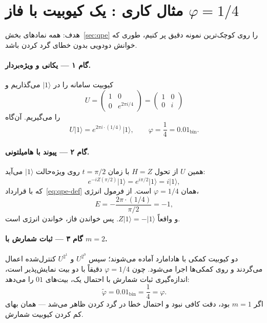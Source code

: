\section{مثال کاری : یک کیوبیت با فاز $\varphi=1/4$}
\label{sec:qpe-example}

هدف: همه نمادهای بخش~\ref{sec:qpe} را روی کوچک‌ترین نمونه دقیق پر کنیم، طوری که خوانش دودویی بدون خطای گرد کردن باشد.

\paragraph{گام ۱ --- یکانی و ویژه‌بردار.}
کیوبیت سامانه را در $\lvert1\rangle$ می‌گذاریم و
\begin{equation}
	U
	=
	\begin{pmatrix}
		1&0\\
		0&e^{2\pi i/4}
	\end{pmatrix}
	=
	\begin{pmatrix}
		1&0\\
		0&i
	\end{pmatrix}
\end{equation}
را می‌گیریم. آن‌گاه
\begin{equation}
	U\lvert1\rangle = e^{2\pi i\cdot(1/4)}\lvert1\rangle,
	\qquad
	\varphi=\frac14=0.01_{\mathrm{bin}}.
\end{equation}

\paragraph{گام ۲ --- پیوند با هامیلتونی.}
همین $U$ از تحول $H=Z$ با زمان $t=\pi/2$ روی ویژه‌حالت $\lvert1\rangle$ می‌آید:
\begin{equation}
	e^{-iZ(\pi/2)}\lvert1\rangle
	=
	e^{i\pi/2}\lvert1\rangle
	=
	i\lvert1\rangle,
\end{equation}
که با قرارداد~\eqref{eq:qpe-def} همان $\varphi=1/4$ است. از فرمول انرژی،
\begin{equation}
	E = -\frac{2\pi\cdot(1/4)}{\pi/2} = -1,
\end{equation}
و واقعاً $Z\lvert1\rangle=-\lvert1\rangle$. پس خواندن فاز، خواندن انرژی است.

\paragraph{گام ۳ --- ثبات شمارش با $m=2$.}
دو کیوبیت کمکی با هادامارد آماده می‌شوند؛ سپس $U^{2^{0}}$ و $U^{2^{1}}$ کنترل‌شده اعمال می‌گردند و  روی کمکی‌ها اجرا می‌شود. چون $\varphi=1/4$ دقیقاً با دو بیت نمایش‌پذیر است، اندازه‌گیری ثبات شمارش با احتمال یک، بیت‌های $01$ را می‌دهد:
\begin{equation}
	\tilde\varphi = 0.01_{\mathrm{bin}} = \frac14=\varphi.
\end{equation}
اگر $m=1$ بود، دقت کافی نبود و احتمال خطا در گرد کردن ظاهر می‌شد --- همان بهای کم کردن کیوبیت شمارش.

